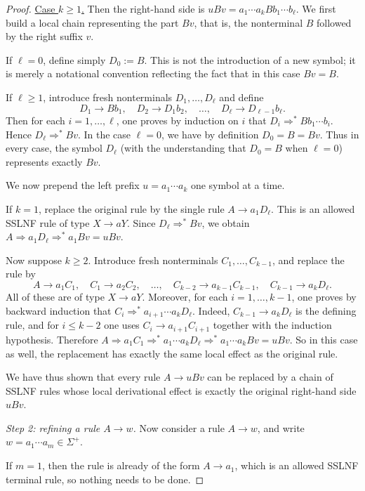 \documentclass[11pt,a4paper]{article}
\begin{document}
\begin{proof}
\smallskip\noindent\underline{Case $k\ge 1$.}
Then the right-hand side is $uBv=a_1\cdots a_kBb_1\cdots b_\ell$. We first build a local chain representing the part $Bv$, that is, the nonterminal $B$ followed by the right suffix $v$.

If $\ell=0$, define simply $D_0:=B$. This is not the introduction of a new symbol; it is merely a notational convention reflecting the fact that in this case $Bv=B$.

If $\ell\ge 1$, introduce fresh nonterminals $D_1,\dots,D_\ell$ and define
\[
D_1\to Bb_1,\quad
D_2\to D_1b_2,\quad
\dots,\quad
D_\ell\to D_{\ell-1}b_\ell.
\]
Then for each $i=1,\dots,\ell$, one proves by induction on $i$ that $D_i\Rightarrow^* Bb_1\cdots b_i$. Hence $D_\ell\Rightarrow^* Bv$. In the case $\ell=0$, we have by definition $D_0=B=Bv$. Thus in every case, the symbol $D_\ell$ (with the understanding that $D_0=B$ when $\ell=0$) represents exactly $Bv$.

We now prepend the left prefix $u=a_1\cdots a_k$ one symbol at a time.

If $k=1$, replace the original rule by the single rule $A\to a_1D_\ell$. This is an allowed SSLNF rule of type $X\to aY$. Since $D_\ell\Rightarrow^* Bv$, we obtain $A\Rightarrow a_1D_\ell\Rightarrow^* a_1Bv=uBv$.

Now suppose $k\ge 2$. Introduce fresh nonterminals $C_1,\dots,C_{k-1}$, and replace the rule by
\[
A\to a_1C_1,\quad
C_1\to a_2C_2,\quad
\dots,\quad
C_{k-2}\to a_{k-1}C_{k-1},\quad
C_{k-1}\to a_kD_\ell.
\]
All of these are of type $X\to aY$. Moreover, for each $i=1,\dots,k-1$, one proves by backward induction that
$C_i\Rightarrow^* a_{i+1}\cdots a_kD_\ell$.
Indeed, $C_{k-1}\to a_kD_\ell$ is the defining rule, and for $i\le k-2$ one uses $C_i\to a_{i+1}C_{i+1}$ together with the induction hypothesis. Therefore
$A\Rightarrow a_1C_1\Rightarrow^* a_1\cdots a_kD_\ell\Rightarrow^* a_1\cdots a_kBv=uBv$.
So in this case as well, the replacement has exactly the same local effect as the original rule.

We have thus shown that every rule $A\to uBv$ can be replaced by a chain of SSLNF rules whose local derivational effect is exactly the original right-hand side $uBv$.

\smallskip\noindent\emph{Step 2: refining a rule $A\to w$.}
Now consider a rule $A\to w$, and write $w=a_1\cdots a_m\in\Sigma^+$.

If $m=1$, then the rule is already of the form $A\to a_1$, which is an allowed SSLNF terminal rule, so nothing needs to be done.


\end{proof}
\end{document}
